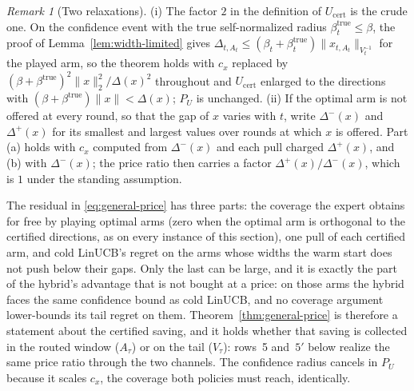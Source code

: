\documentclass{article}
\theoremstyle{definition}
\theoremstyle{remark}
\newtheorem{remark}{Remark}
\theoremstyle{remark}
\begin{document}
\begin{remark}[Two relaxations]
\label{rem:relaxations}
(i) The factor $2$ in the definition of $U_{\mathrm{cert}}$ is the crude
one. On the confidence event with the true self-normalized radius
$\beta^{\mathrm{true}}_t\le\beta$, the proof of Lemma~\ref{lem:width-limited}
gives $\Delta_{t,A_t}\le(\beta_t+\beta^{\mathrm{true}}_t)\|x_{t,A_t}\|_{V_t^{-1}}$
for the played arm, so the theorem holds with $c_x$ replaced by
$(\beta+\beta^{\mathrm{true}})^2\|x\|_2^2/\Delta(x)^2$ throughout and
$U_{\mathrm{cert}}$ enlarged to the directions with
$(\beta+\beta^{\mathrm{true}})\|x\|<\Delta(x)$; $P_U$ is unchanged. (ii) If the
optimal arm is not offered at every round, so that the gap of $x$ varies
with $t$, write $\Delta^-(x)$ and $\Delta^+(x)$ for its smallest and largest
values over rounds at which $x$ is offered. Part (a) holds with $c_x$ computed
from $\Delta^-(x)$ and each pull charged $\Delta^+(x)$, and (b) with
$\Delta^-(x)$; the price ratio then carries a factor $\Delta^+(x)/\Delta^-(x)$,
which is $1$ under the standing assumption.
\end{remark}

The residual in \eqref{eq:general-price} has three parts: the coverage the
expert obtains for free by playing optimal arms (zero when the optimal arm is
orthogonal to the certified directions, as on every instance of this
section), one pull of each certified arm, and cold LinUCB's regret on the arms
whose widths the warm start does not push below their gaps. Only the last can
be large, and it is exactly the part of the hybrid's advantage that is not
bought at a price: on those arms the hybrid faces the same confidence bound
as cold LinUCB, and no coverage argument lower-bounds its tail regret on them.
Theorem~\ref{thm:general-price} is therefore a statement about the certified
saving, and it holds whether that saving is collected in the routed window
($A_\tau$) or on the tail ($V_\tau$): rows~5 and~$5'$ below realize the same
price ratio through the two channels. The confidence radius cancels in $P_U$
because it scales $c_x$, the coverage both policies must reach, identically.
\end{document}
